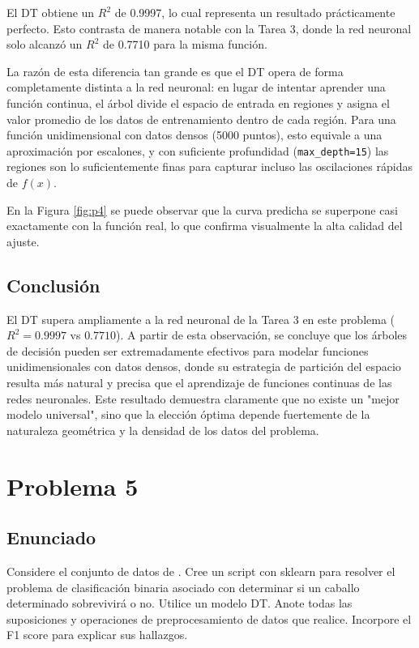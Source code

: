 \documentclass{article}
\begin{document}
El DT obtiene un $R^2$ de 0.9997, lo cual representa un resultado prácticamente perfecto. Esto contrasta de manera notable con la Tarea 3, donde la red neuronal solo alcanzó un $R^2$ de 0.7710 para la misma función.

La razón de esta diferencia tan grande es que el DT opera de forma completamente distinta a la red neuronal: en lugar de intentar aprender una función continua, el árbol divide el espacio de entrada en regiones y asigna el valor promedio de los datos de entrenamiento dentro de cada región. Para una función unidimensional con datos densos (5000 puntos), esto equivale a una aproximación por escalones, y con suficiente profundidad (\texttt{max\_depth=15}) las regiones son lo suficientemente finas para capturar incluso las oscilaciones rápidas de $f(x)$.

En la Figura \ref{fig:p4} se puede observar que la curva predicha se superpone casi exactamente con la función real, lo que confirma visualmente la alta calidad del ajuste.

\subsection{Conclusión}

El DT supera ampliamente a la red neuronal de la Tarea 3 en este problema ($R^2 = 0.9997$ vs $0.7710$). A partir de esta observación, se concluye que los árboles de decisión pueden ser extremadamente efectivos para modelar funciones unidimensionales con datos densos, donde su estrategia de partición del espacio resulta más natural y precisa que el aprendizaje de funciones continuas de las redes neuronales. Este resultado demuestra claramente que no existe un "mejor modelo universal", sino que la elección óptima depende fuertemente de la naturaleza geométrica y la densidad de los datos del problema.

\section{Problema 5}

\subsection{Enunciado}

Considere el conjunto de datos de \cite{KaggleHorseSurvivalData}. Cree un script con sklearn para resolver el problema de clasificación binaria asociado con determinar si un caballo determinado sobrevivirá o no. Utilice un modelo DT. Anote todas las suposiciones y operaciones de preprocesamiento de datos que realice. Incorpore el F1 score para explicar sus hallazgos.
\end{document}
